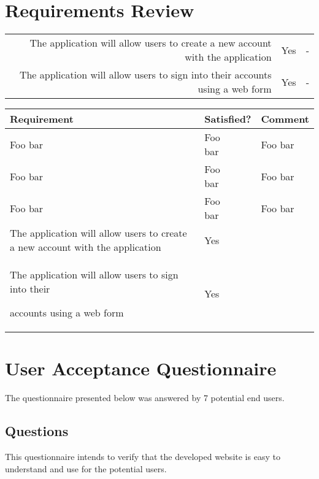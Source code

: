 \chapter{Requirements Review}
\label{ch:requirementsreview_appendix}

\begin{center}
\begin{tabular}{|rcc|}
\hline
  The application will allow users to create a new account with the application & Yes & - \\ 
  The application will allow users to sign into their accounts using a web form & Yes & -  \\ \hline
\end{tabular}
\end{center}

\begin{tabular}{@{}lll@{}}
        \toprule
        Requirement & Satisfied? & Comment \\
        \midrule
        Foo bar & \specialcell{Foo\\bar} & Foo bar \\    %
Foo bar & \specialcell[t]{Foo\\bar} & Foo bar \\ %
Foo bar & \specialcell[b]{Foo\\bar} & Foo bar \\ %
       The application will allow users to create a new account with the application & Yes & \\
        The application will allow users to sign into their\par 
        accounts using a web form & Yes & \\
        \bottomrule
\end{tabular}

\chapter{User Acceptance Questionnaire}
\label{ch:ua_questionnaire_appendix}
The questionnaire presented below was answered by 7 potential end users. 

\section{Questions}
\label{sec:ua_questions_appendix}
This questionnaire intends to verify that the developed website is easy to understand and use for the potential users.

